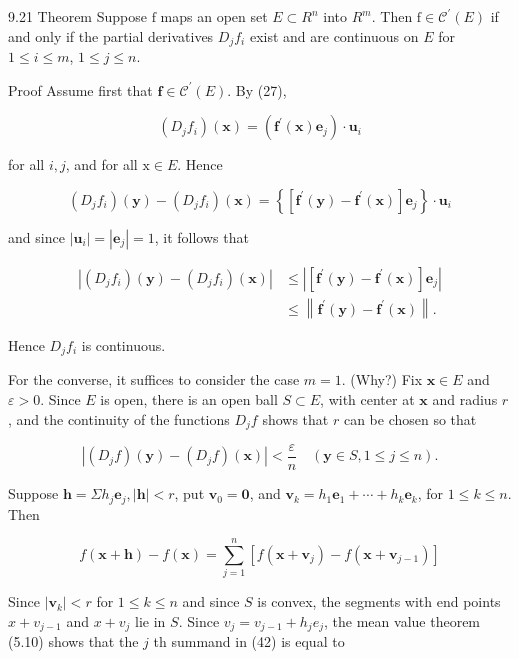 \documentclass[10pt]{article}
\begin{document}
9.21 Theorem Suppose $\mathrm{f}$ maps an open set $E \subset R^{n}$ into $R^{m}$. Then $\mathrm{f} \in \mathscr{C}^{\prime}(E)$ if and only if the partial derivatives $D_{j} f_{i}$ exist and are continuous on $E$ for $1 \leq i \leq m$, $1 \leq j \leq n$.

Proof Assume first that $\mathbf{f} \in \mathscr{C}^{\prime}(E)$. By (27),

$$
\left(D_{j} f_{i}\right)(\mathbf{x})=\left(\mathbf{f}^{\prime}(\mathbf{x}) \mathbf{e}_{j}\right) \cdot \mathbf{u}_{i}
$$

for all $i, j$, and for all $\mathrm{x} \in E$. Hence

$$
\left(D_{j} f_{i}\right)(\mathbf{y})-\left(D_{j} f_{i}\right)(\mathbf{x})=\left\{\left[\mathbf{f}^{\prime}(\mathbf{y})-\mathbf{f}^{\prime}(\mathbf{x})\right] \mathbf{e}_{j}\right\} \cdot \mathbf{u}_{i}
$$

and since $\left|\mathbf{u}_{i}\right|=\left|\mathbf{e}_{j}\right|=1$, it follows that

$$
\begin{aligned}
\left|\left(D_{j} f_{i}\right)(\mathbf{y})-\left(D_{j} f_{i}\right)(\mathbf{x})\right| & \leq\left|\left[\mathbf{f}^{\prime}(\mathbf{y})-\mathbf{f}^{\prime}(\mathbf{x})\right] \mathbf{e}_{j}\right| \\
& \leq\left\|\mathbf{f}^{\prime}(\mathbf{y})-\mathbf{f}^{\prime}(\mathbf{x})\right\| .
\end{aligned}
$$

Hence $D_{j} f_{i}$ is continuous.

For the converse, it suffices to consider the case $m=1$. (Why?) Fix $\mathbf{x} \in E$ and $\varepsilon>0$. Since $E$ is open, there is an open ball $S \subset E$, with center at $\mathbf{x}$ and radius $r$, and the continuity of the functions $D_{j} f$ shows that $r$ can be chosen so that

$$
\left|\left(D_{j} f\right)(\mathbf{y})-\left(D_{j} f\right)(\mathbf{x})\right|<\frac{\varepsilon}{n} \quad(\mathbf{y} \in S, 1 \leq j \leq n) .
$$

Suppose $\mathbf{h}=\Sigma h_{j} \mathbf{e}_{j},|\mathbf{h}|<r$, put $\mathbf{v}_{0}=\mathbf{0}$, and $\mathbf{v}_{k}=h_{1} \mathbf{e}_{1}+\cdots+h_{k} \mathbf{e}_{k}$, for $1 \leq k \leq n$. Then

$$
f(\mathbf{x}+\mathbf{h})-f(\mathbf{x})=\sum_{j=1}^{n}\left[f\left(\mathbf{x}+\mathbf{v}_{j}\right)-f\left(\mathbf{x}+\mathbf{v}_{j-1}\right)\right]
$$

Since $\left|\mathbf{v}_{k}\right|<r$ for $1 \leq k \leq n$ and since $S$ is convex, the segments with end points $x+v_{j-1}$ and $x+v_{j}$ lie in $S$. Since $v_{j}=v_{j-1}+h_{j} e_{j}$, the mean value theorem (5.10) shows that the $j$ th summand in (42) is equal to
\end{document}
